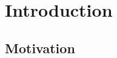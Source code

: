 \documentclass[
	bibliography=totoc,
	listof=totoc,
]{scrbook}
\begin{document}
\vfill %
\pagebreak %
\chapter{Introduction} %
\section*{Motivation} %
\end{document}
